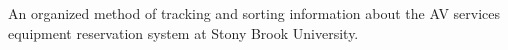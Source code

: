 \documentclass[]{plushcv}
\begin{document}
\begin{minipage}[t]{0.70\textwidth}
\begin{tightemize}
\item An organized method of tracking and sorting information about the AV services equipment reservation system at Stony Brook University.
\end{tightemize}
\sectionsep


%
%

\end{minipage} 
\hfill
\end{document}
